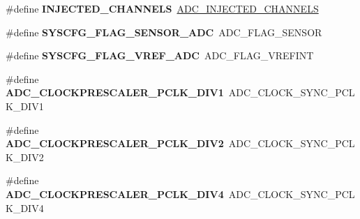 \begin{DoxyCompactItemize}
\item 
\#define {\bfseries I\+N\+J\+E\+C\+T\+E\+D\+\_\+\+C\+H\+A\+N\+N\+E\+LS}~\hyperlink{group___a_d_c__channels__type_ga6444b1539e8503ef3a2496ccf7eeb9fd}{A\+D\+C\+\_\+\+I\+N\+J\+E\+C\+T\+E\+D\+\_\+\+C\+H\+A\+N\+N\+E\+LS}\hypertarget{group___h_a_l___a_d_c___aliased___defines_ga458eefd477e1e06e313716de162b7d0f}{}\label{group___h_a_l___a_d_c___aliased___defines_ga458eefd477e1e06e313716de162b7d0f}

\item 
\#define {\bfseries S\+Y\+S\+C\+F\+G\+\_\+\+F\+L\+A\+G\+\_\+\+S\+E\+N\+S\+O\+R\+\_\+\+A\+DC}~A\+D\+C\+\_\+\+F\+L\+A\+G\+\_\+\+S\+E\+N\+S\+OR\hypertarget{group___h_a_l___a_d_c___aliased___defines_ga48929ac8156ee0ea52c25ad3ec9fed11}{}\label{group___h_a_l___a_d_c___aliased___defines_ga48929ac8156ee0ea52c25ad3ec9fed11}

\item 
\#define {\bfseries S\+Y\+S\+C\+F\+G\+\_\+\+F\+L\+A\+G\+\_\+\+V\+R\+E\+F\+\_\+\+A\+DC}~A\+D\+C\+\_\+\+F\+L\+A\+G\+\_\+\+V\+R\+E\+F\+I\+NT\hypertarget{group___h_a_l___a_d_c___aliased___defines_gaa7f5151463037ce60032a869f3e71665}{}\label{group___h_a_l___a_d_c___aliased___defines_gaa7f5151463037ce60032a869f3e71665}

\item 
\#define {\bfseries A\+D\+C\+\_\+\+C\+L\+O\+C\+K\+P\+R\+E\+S\+C\+A\+L\+E\+R\+\_\+\+P\+C\+L\+K\+\_\+\+D\+I\+V1}~A\+D\+C\+\_\+\+C\+L\+O\+C\+K\+\_\+\+S\+Y\+N\+C\+\_\+\+P\+C\+L\+K\+\_\+\+D\+I\+V1\hypertarget{group___h_a_l___a_d_c___aliased___defines_gaaf80e00044e185957328f1d59bacdf37}{}\label{group___h_a_l___a_d_c___aliased___defines_gaaf80e00044e185957328f1d59bacdf37}

\item 
\#define {\bfseries A\+D\+C\+\_\+\+C\+L\+O\+C\+K\+P\+R\+E\+S\+C\+A\+L\+E\+R\+\_\+\+P\+C\+L\+K\+\_\+\+D\+I\+V2}~A\+D\+C\+\_\+\+C\+L\+O\+C\+K\+\_\+\+S\+Y\+N\+C\+\_\+\+P\+C\+L\+K\+\_\+\+D\+I\+V2\hypertarget{group___h_a_l___a_d_c___aliased___defines_ga058aa1143f9f7f123362039c9efcf4cb}{}\label{group___h_a_l___a_d_c___aliased___defines_ga058aa1143f9f7f123362039c9efcf4cb}

\item 
\#define {\bfseries A\+D\+C\+\_\+\+C\+L\+O\+C\+K\+P\+R\+E\+S\+C\+A\+L\+E\+R\+\_\+\+P\+C\+L\+K\+\_\+\+D\+I\+V4}~A\+D\+C\+\_\+\+C\+L\+O\+C\+K\+\_\+\+S\+Y\+N\+C\+\_\+\+P\+C\+L\+K\+\_\+\+D\+I\+V4\hypertarget{group___h_a_l___a_d_c___aliased___defines_ga98bc3d5a9f7e069183a205c8458a6645}{}\label{group___h_a_l___a_d_c___aliased___defines_ga98bc3d5a9f7e069183a205c8458a6645}


\end{DoxyCompactItemize}
